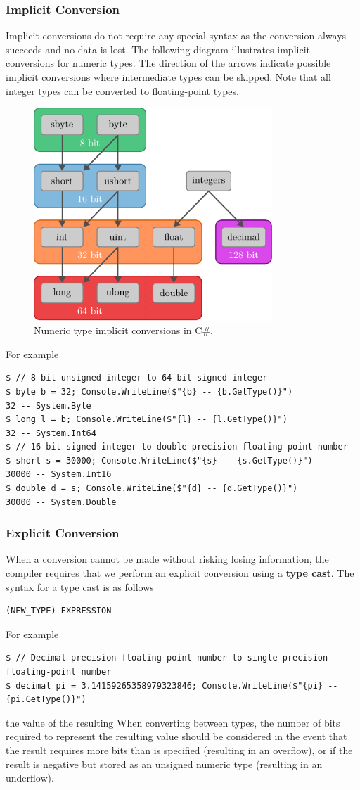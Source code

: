 \documentclass{article}
\begin{document}
\subsubsection{Implicit Conversion}
Implicit conversions do not require any special syntax as the conversion
always succeeds and no data is lost.
The following diagram illustrates implicit conversions for numeric types.
The direction of the arrows indicate possible implicit conversions where
intermediate types can be skipped.
Note that all integer types can be converted to floating-point types.
\begin{figure}[H]
    \centering
    \includegraphics[height = 8cm, keepaspectratio = true]{figures/implicit_conversions.pdf}
    \caption{Numeric type implicit conversions in C\#.}
\end{figure}
For example
\begin{lstlisting}
$ // 8 bit unsigned integer to 64 bit signed integer 
$ byte b = 32; Console.WriteLine($"{b} -- {b.GetType()}")
32 -- System.Byte
$ long l = b; Console.WriteLine($"{l} -- {l.GetType()}")
32 -- System.Int64
$ // 16 bit signed integer to double precision floating-point number
$ short s = 30000; Console.WriteLine($"{s} -- {s.GetType()}")
30000 -- System.Int16
$ double d = s; Console.WriteLine($"{d} -- {d.GetType()}")
30000 -- System.Double
\end{lstlisting}
\subsubsection{Explicit Conversion}
When a conversion cannot be made without risking losing information,
the compiler requires that we perform an explicit conversion using a \textbf{type cast}.
The syntax for a type cast is as follows
\begin{lstlisting}
(NEW_TYPE) EXPRESSION
\end{lstlisting}
For example
\begin{lstlisting}
$ // Decimal precision floating-point number to single precision floating-point number
$ decimal pi = 3.14159265358979323846; Console.WriteLine($"{pi} -- {pi.GetType()}")
\end{lstlisting}
the value of the resulting
When converting between types, the number of bits required to represent the
resulting value should be considered in the event that the result
requires more bits than is specified (resulting in an overflow), or if the result is
negative but stored as an unsigned numeric type (resulting in an underflow).
\end{document}
